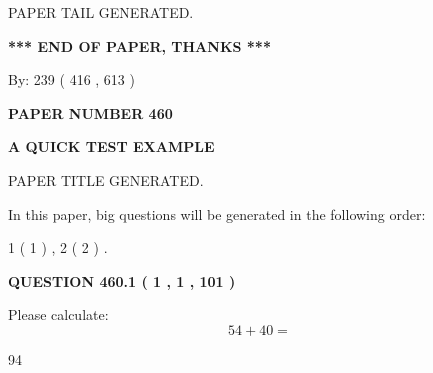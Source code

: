 \documentclass[12pt]{article}
\begin{document}
\vspace{2.0in} PAPER TAIL GENERATED.
   
   
   
   
\vspace{1.0in} 
{\textbf{\large{ *** END OF PAPER, THANKS *** }}} 
   
   
\hspace{1.0in} By: 
 239 ( 416 ,  613 )
   
   
   
   
\newpage 
\setcounter{page}{ 
   460001 } 
   
   
   
   
 {\textbf{ \Large{ PAPER NUMBER  460  }}}
   
   
\vspace{0.2in}
   
   
   
   
   
   
   
   
 \vspace{0.2in}
{\LARGE {\textbf{ A QUICK TEST EXAMPLE}}}
   
   
 PAPER TITLE GENERATED.
   
   
   
\vspace{0.2in}
   
In this paper, big questions will be generated in the following order: 
   
   
   1 ( 1 )
 ,
   2 ( 2 )
 .
  
\vspace{0.2in}
  
{\textbf{\Large{QUESTION
460.1 
 ( 1 , 1 , 101 )
}}}
  
  
 
Please calculate:
\begin{equation}
54 +  %
40 = \nonumber
\end{equation}
 
 
 
\noindent{}
 
 

94
 
 
\noindent{}
 
 

 
 
\end{document}
